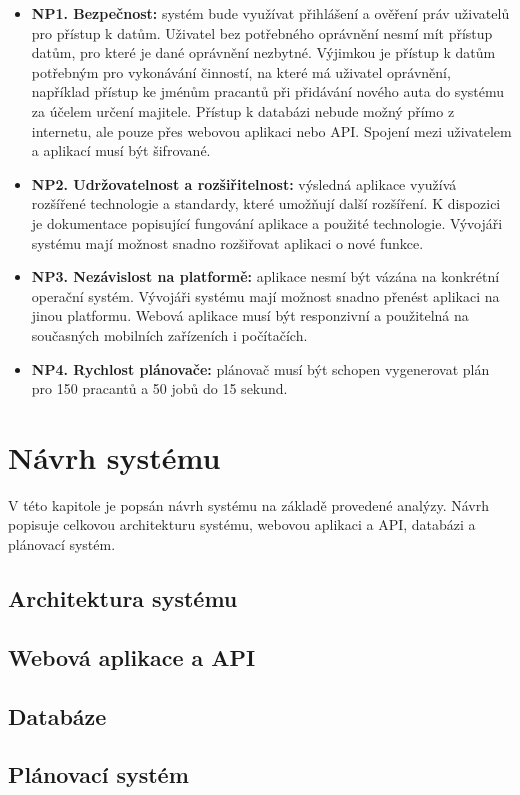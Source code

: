 \begin{itemize}
    \item \textbf{NP1. Bezpečnost:} systém bude využívat přihlášení a ověření práv uživatelů pro přístup k datům. Uživatel bez potřebného oprávnění nesmí mít přístup datům, pro které je dané oprávnění nezbytné. Výjimkou je přístup k datům potřebným pro vykonávání činností, na které má uživatel oprávnění, například přístup ke jménům pracantů při přidávání nového auta do systému za účelem určení majitele. Přístup k databázi nebude možný přímo z internetu, ale pouze přes webovou aplikaci nebo API. Spojení mezi uživatelem a aplikací musí být šifrované.
    \item \textbf{NP2. Udržovatelnost a rozšiřitelnost:} výsledná aplikace využívá rozšířené technologie a standardy, které umožňují další rozšíření. K dispozici je dokumentace popisující fungování aplikace a použité technologie. Vývojáři systému mají možnost snadno rozšiřovat aplikaci o nové funkce.
    \item \textbf{NP3. Nezávislost na platformě:} aplikace nesmí být vázána na konkrétní operační systém. Vývojáři systému mají možnost snadno přenést aplikaci na jinou platformu. Webová aplikace musí být responzivní a použitelná na současných mobilních zařízeních i počítačích.
    \item \textbf{NP4. Rychlost plánovače:} plánovač musí být schopen vygenerovat plán pro 150 pracantů a 50 jobů do 15 sekund.
\end{itemize}

\section{Návrh systému}

V této kapitole je popsán návrh systému na základě provedené analýzy. Návrh popisuje celkovou architekturu systému, webovou aplikaci a API, databázi a plánovací systém.

\subsection{Architektura systému}

\subsection{Webová aplikace a API}

\subsection{Databáze}

\subsection{Plánovací systém}